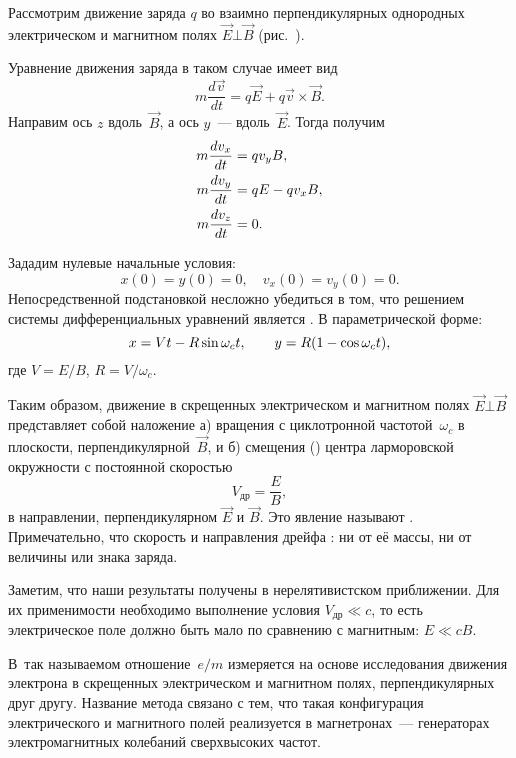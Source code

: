 
Рассмотрим движение заряда $q$ во взаимно перпендикулярных однородных электрическом
и магнитном полях $\vec{E}\bot\vec{B}$ (рис.~).

Уравнение движения заряда в таком случае имеет вид
\[
m\frac{d\vec{v}}{dt} = q\vec{E} + q \vec{v}\times \vec{B}.
\]
Направим ось $z$ вдоль~$\vec{B}$, а ось $y$~--- вдоль~$\vec{E}$.
Тогда получим
\begin{equation}
    \eqmark{3.9}
    \begin{aligned}
    m\frac{dv_x}{dt}&=qv_y B,\\
    m\frac{dv_y}{dt}&=qE-qv_x B,\\
    m\frac{dv_z}{dt}&=0.
\end{aligned}
\end{equation}

Зададим нулевые начальные условия:
\[x(0)=y(0)=0,\quad v_x(0)=v_y(0)=0.\]
Непосредственной подстановкой несложно убедиться в том, что решением системы
дифференциальных уравнений является .
В параметрической форме:
\begin{equation}
    \eqmark{3.11}
    x = Vt - R\sin\omega_c t,\qquad y = R(1-\cos\omega_c t),
\end{equation}
где $V=E/B$, $R=V/\omega_c$.

Таким образом, движение в скрещенных электрическом и магнитном полях
$\vec{E}\bot \vec{B}$ представляет собой наложение
а) вращения с циклотронной частотой~$\omega_c$ в плоскости,
перпендикулярной~$\vec{B}$, и б) смещения () центра ларморовской
окружности с постоянной скоростью
\begin{equation}
    V_{др} = \frac{E}{B},
\end{equation}
в направлении, перпендикулярном $\vec{E}$ и $\vec{B}$. Это явление
называют . Примечательно, что
скорость и направления дрейфа :
ни от её массы, ни от величины или знака заряда.

Заметим, что наши результаты получены в нерелятивистском приближении.
Для их применимости необходимо выполнение условия $V_{др}\ll c$,
то есть электрическое поле должно быть мало по сравнению с магнитным: $E\ll cB$.
\todo[inline,color=green]{<--}

В~так называемом {} отношение~$e/m$ измеряется на
основе исследования движения электрона в скрещенных электрическом и магнитном
полях, перпендикулярных друг другу. Название метода связано с тем, что такая
конфигурация электрического и магнитного полей реализуется в магнетронах~---
генераторах электромагнитных колебаний
сверхвысоких частот.

